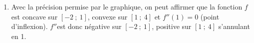 \begin{enumerate}
	 $\dfrac{1}{2}\e^1+k=1 \iff k=1-\dfrac{1}{2}\e$. Donc $\forall x \in \R$, $F(x)=\dfrac{1}{2}\e^{2x+1}+1-\dfrac{1}{2}\e$. \hfill {}
	 \item Avec la précision permise par le graphique, on peut affirmer que la fonction $f$ est concave sur $[-2~;~1]$, convexe sur $[1~;~4]$ et $f''(1)=0$ (point d'inflexion). $f''$est donc négative sur $[-2~;~1]$, positive sur $[1~;~4]$ s'annulant en 1. \hfill {}
\end{enumerate}

\pagebreak
